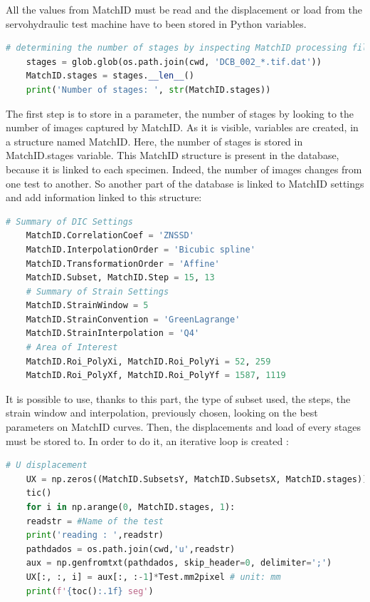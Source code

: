 All the values from MatchID must be read and the displacement or load from the servohydraulic test machine have to been stored in Python variables. 

\begin{lstlisting}[language=Python]
	# determining the number of stages by inspecting MatchID processing files
	stages = glob.glob(os.path.join(cwd, 'DCB_002_*.tif.dat'))
	MatchID.stages = stages.__len__()
	print('Number of stages: ', str(MatchID.stages))
\end{lstlisting}

The first step is to store in a parameter, the number of stages by looking to the number of images captured by MatchID. As it is visible, variables are created, in a structure named MatchID. Here, the number of stages is stored in MatchID.stages variable. This MatchID structure is present in the database, because it is linked to each specimen. Indeed, the number of images changes from one test to another. So another part of the database is linked to MatchID settings and add information linked to this structure:  

\begin{lstlisting}[language=Python]
	# Summary of DIC Settings
	MatchID.CorrelationCoef = 'ZNSSD'
	MatchID.InterpolationOrder = 'Bicubic spline'
	MatchID.TransformationOrder = 'Affine'
	MatchID.Subset, MatchID.Step = 15, 13
	# Summary of Strain Settings
	MatchID.StrainWindow = 5
	MatchID.StrainConvention = 'GreenLagrange'
	MatchID.StrainInterpolation = 'Q4'
	# Area of Interest
	MatchID.Roi_PolyXi, MatchID.Roi_PolyYi = 52, 259
	MatchID.Roi_PolyXf, MatchID.Roi_PolyYf = 1587, 1119
\end{lstlisting}

It is possible to use, thanks to this part, the type of subset used, the steps, the strain window and interpolation, previously chosen, looking on the best parameters on MatchID curves. Then, the displacements and load of every stages must be stored to. In order to do it, an iterative loop is created :

\begin{lstlisting}[language=Python]
	# U displacement
	UX = np.zeros((MatchID.SubsetsY, MatchID.SubsetsX, MatchID.stages))
	tic()
	for i in np.arange(0, MatchID.stages, 1):
	readstr = #Name of the test
	print('reading : ',readstr)
	pathdados = os.path.join(cwd,'u',readstr)
	aux = np.genfromtxt(pathdados, skip_header=0, delimiter=';')
	UX[:, :, i] = aux[:, :-1]*Test.mm2pixel # unit: mm
	print(f'{toc():.1f} seg')
\end{lstlisting}

